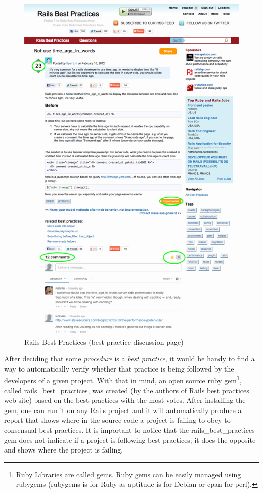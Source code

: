 \begin{figure}[h!]
  \caption{Rails Best Practices (best practice discussion page)}\label{fig:rbp_web}
  \centering
  \includegraphics[scale=0.75]{Images/rbp_web}
\end{figure}


After deciding that some \emph{procedure} is a \emph{best practice},
it would be handy to find a way to automatically verify whether 
that practice is being followed by the developers of a given project.
With that in mind, an open source ruby 
\textsf{gem}\footnote{
  Ruby Libraries are called gems. Ruby gems can be easily managed using rubygems 
  (rubygems is for Ruby as aptitude is for Debian or cpan for perl).
}, 
called rails\_best\_practices, was created (by the authors of Rails best practices web site) 
based on the best practices with the most votes. 
After installing the gem, one can run it on any Rails project
and it will automatically produce a report that shows where
in the source code a project is failing to obey to consensual best practices.
It is important to notice that the rails\_best\_practices gem does not indicate if a project is following best practices;
it does the opposite and shows where the project is failing.

